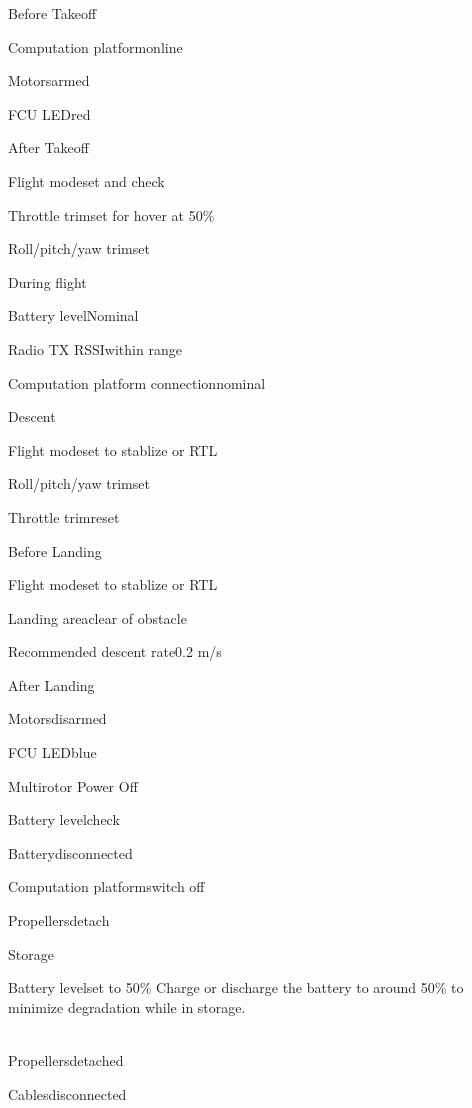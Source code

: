 \begin{multicols}{2}
\begin{checklist}{Before Takeoff}
	\item{Computation platform}{online}
	\item{Motors}{armed}
	\item{FCU LED}{red}
\end{checklist}

\begin{checklist}{After Takeoff}
	\item{Flight mode}{set and check}
	\item{Throttle trim}{set for hover at 50\%}
	\item{Roll/pitch/yaw trim}{set}
\end{checklist}

\begin{checklist}{During flight}
	\item{Battery level}{Nominal}
	\item{Radio TX RSSI}{within range}
	\item{Computation platform connection}{nominal}
\end{checklist}

\begin{checklist}{Descent}
	\item{Flight mode}{set to stablize or RTL}
	\item{Roll/pitch/yaw trim}{set}
	\item{Throttle trim}{reset}
\end{checklist}

\begin{checklist}{Before Landing}
	\item{Flight mode}{set to stablize or RTL}
	\item{Landing area}{clear of obstacle}
	\item{Recommended descent rate}{0.2 m/s}
\end{checklist}

\begin{checklist}{After Landing}
	\item{Motors}{disarmed}
	\item{FCU LED}{blue}
\end{checklist}

\begin{checklist}{Multirotor Power Off}
	\item{Battery level}{check}
	\item{Battery}{disconnected}
	\item{Computation platform}{switch off}
	\item{Propellers}{detach}
\end{checklist}

\begin{checklist}{Storage}
	\item{Battery level}{set to 50\%} Charge or discharge the battery to around 50\% to minimize degradation while in storage.\\\\
	\item{Propellers}{detached}
	\item{Cables}{disconnected}
\end{checklist}

\end{multicols}
\clearpage